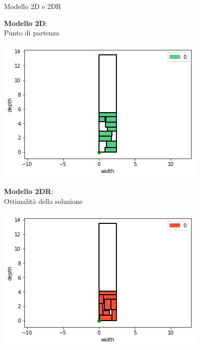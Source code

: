 \documentclass{beamer}
\begin{document}
\begin{frame}{Modello 2D e 2DR}
									
	\begin{minipage}[c]{0.45\textwidth}
		\textbf{Modello 2D}:\\Punto di partenza
	\end{minipage}
	\hfill
	\begin{minipage}[c]{0.45\textwidth}
		\includegraphics[width=1\linewidth]{figures/general2D}
	\end{minipage}
							
	\begin{minipage}[c]{0.45\textwidth}
		\textbf{Modello 2DR}:\\Ottimalit\`a della soluzione
	\end{minipage}
	\hfill
	\begin{minipage}[c]{0.45\textwidth}
		\includegraphics[width=1\linewidth]{figures/general2DR}
	\end{minipage}
\end{frame}
\end{document}

